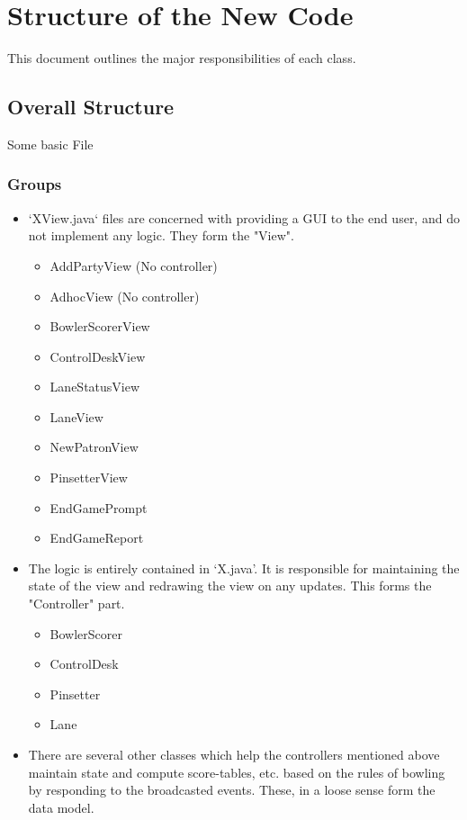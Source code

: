 \section{Structure of the New Code}


This document outlines the major responsibilities of each class.

\subsection{Overall Structure}

Some basic File \subsubsection{Groups}
\begin{itemize}
    \item `XView.java` files are concerned with providing a GUI to the end user, and do not implement any logic. They form the "View".
          \begin{itemize}
              \item AddPartyView (No controller)
              \item AdhocView (No controller)
              \item BowlerScorerView
              \item ControlDeskView
              \item LaneStatusView
              \item LaneView
              \item NewPatronView
              \item PinsetterView
              \item EndGamePrompt
              \item EndGameReport
          \end{itemize}
    \item The logic is entirely contained in `X.java'. It is responsible for maintaining the state of the view and redrawing the view on any updates. This forms the "Controller" part.
          \begin{itemize}
              \item BowlerScorer
              \item ControlDesk
              \item Pinsetter
              \item Lane
          \end{itemize}
    \item There are several other classes which help the controllers mentioned above maintain state and compute score-tables, etc. based on the rules of bowling by responding to the broadcasted events. These, in a loose sense form the data model.

\end{itemize}
